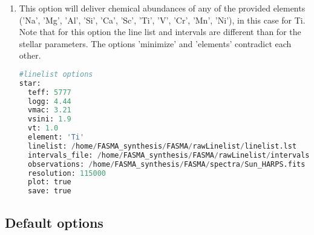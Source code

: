 \documentclass[a4paper,12pt]{article}
\begin{document}
\begin{enumerate}
 \item This option will deliver chemical abundances of any of the provided elements ('Na', 'Mg', 'Al', 'Si', 'Ca', 'Sc', 'Ti', 'V', 'Cr', 'Mn', 'Ni'), in this case for Ti. 
 Note that for this option the line list and intervals are different than for the stellar parameters. The options 'minimize' and 'elements' contradict each other.
 {\footnotesize

\begin{lstlisting}[language=Python]
#linelist options
star:
  teff: 5777
  logg: 4.44
  vmac: 3.21
  vsini: 1.9
  vt: 1.0
  element: 'Ti'
  linelist: /home/FASMA_synthesis/FASMA/rawLinelist/linelist.lst
  intervals_file: /home/FASMA_synthesis/FASMA/rawLinelist/intervals.lst
  observations: /home/FASMA_synthesis/FASMA/spectra/Sun_HARPS.fits
  resolution: 115000
  plot: true
  save: true
\end{lstlisting}}

\end{enumerate}


\subsection{Default options}
\end{document}
